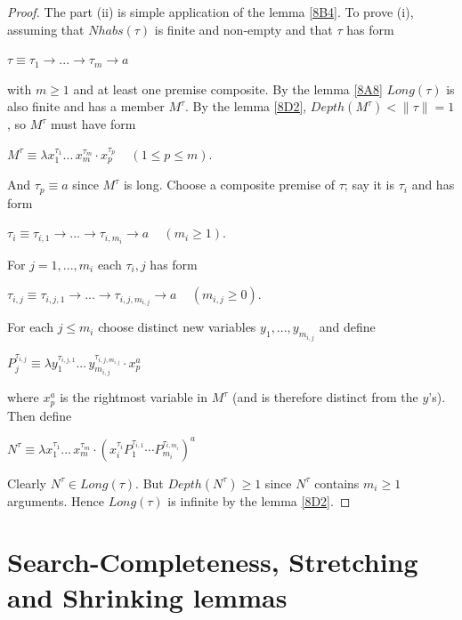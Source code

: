 \documentclass[a4paper,10pt]{article}
\begin{document}
\begin{theo}
\begin{proof}
The part (ii) is simple application of the lemma \ref{8B4}. To prove (i), assuming that $Nhabs(\tau)$ is finite and non-empty and that
$\tau$ has form
\begin{center}
 $\tau \equiv \tau_1 \to ... \to \tau_m \to a$
\end{center}
with $m \geq 1$ and at least one premise composite. By the lemma \ref{8A8} $Long(\tau)$ is also finite and has a member $M^{\tau}$.
By the lemma \ref{8D2}, $Depth(M^{\tau}) < \rVert\tau\rVert = 1$, so $M^{\tau}$ must have form
\begin{center}
$M^{\tau} \equiv \lambda x_1^{\tau_1} ...\,x_m^{\tau_m} \cdot x_p^{\tau_p}  \,\,\,\,\,\,\, (1 \leq p \leq m).$ 
\end{center}
And $\tau_p \equiv a$ since $M^{\tau}$ is long. Choose a composite premise of $\tau$; say it is $\tau_i$ and has form
\begin{center}
$\tau_i \equiv \tau_{i,1} \to ... \to \tau_{i,m_i} \to a \,\,\,\,\,\,\,  (m_i \geq 1).$  
\end{center}
For $j = 1,...,m_i$ each $\tau_i,j$ has form
\begin{center}
$\tau_{i,j} \equiv \tau_{i,j,1} \to ... \to \tau_{i,j,m_{i,j}}\to a \,\,\,\,\,\,\, (m_{i,j} \geq 0).$
\end{center}
For each $j \leq m_i$ choose distinct new variables $y_1, ..., y_{m_{i,j}}$ and define
\begin{center}
$P_j^{\tau_{i,j}} \equiv \lambda y_1^{\tau_{i,j,1}} ...\,y_{m_{i,j}}^{\tau_{i,j,m_{i,j}}} \cdot x_p^a$ 
\end{center}
where $x^a_p$ is the rightmost variable in $M^{\tau}$ (and is therefore distinct from the $y$'s). Then define
\begin{center}
$N^{\tau} \equiv \lambda x_1^{\tau_1} ...\,x_m^{\tau_m} \cdot (x_i^{\tau_i} P_1^{\tau_{i,1}} \cdots P_{m_i}^{\tau_{i,m_i}})^a$ 
\end{center}
Clearly $N^{\tau} \in Long(\tau)$. But $Depth(N^{\tau}) \geq 1$ since $N^{\tau}$ contains $m_i \geq 1$ arguments. 
Hence $Long(\tau)$ is infinite by the lemma \ref{8D2}.
\end{proof}
\end{theo}


\section{Search-Completeness, Stretching and Shrinking lemmas}\label{stretching-shrinking}
\end{document}
